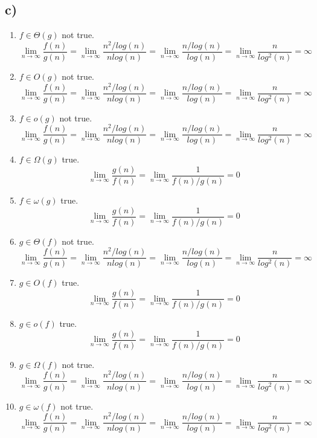 \documentclass{article}
\begin{document}
\subsection*{c)}
\begin{enumerate}
    \item $f \in \Theta(g)$ not true.
        $$ \lim_{n \to \infty} \frac{f(n)}{g(n)} = \lim_{n \to \infty} \frac{ n^2 / log(n)}{n log(n)} = \lim_{n \to \infty} \frac{ n / log(n) }{ log(n)} =
        \lim_{n \to \infty} \frac{n}{ log^2(n)} = \infty $$
    \item $f \in O(g)$ not true.
        $$ \lim_{n \to \infty} \frac{f(n)}{g(n)} = \lim_{n \to \infty} \frac{ n^2 / log(n)}{n log(n)} = \lim_{n \to \infty} \frac{ n / log(n) }{ log(n)} =
        \lim_{n \to \infty} \frac{n}{ log^2(n)} = \infty $$
    \item $f \in o(g)$ not true.
        $$ \lim_{n \to \infty} \frac{f(n)}{g(n)} = \lim_{n \to \infty} \frac{ n^2 / log(n)}{n log(n)} = \lim_{n \to \infty} \frac{ n / log(n) }{ log(n)} =
        \lim_{n \to \infty} \frac{n}{ log^2(n)} = \infty $$
    \item $f \in \Omega(g)$ true.
        $$ \lim_{n \to \infty} \frac{g(n)}{f(n)} = \lim_{n \to \infty} \frac{1}{f(n)/g(n)} = 0 $$
    \item $f \in \omega(g)$ true.
        $$ \lim_{n \to \infty} \frac{g(n)}{f(n)} = \lim_{n \to \infty} \frac{1}{f(n)/g(n)} = 0 $$
    \item $g \in \Theta(f)$ not true.
        $$ \lim_{n \to \infty} \frac{f(n)}{g(n)} = \lim_{n \to \infty} \frac{ n^2 / log(n)}{n log(n)} = \lim_{n \to \infty} \frac{ n / log(n) }{ log(n)} =
        \lim_{n \to \infty} \frac{n}{ log^2(n)} = \infty $$
    \item $g \in O(f)$ true.
        $$ \lim_{n \to \infty} \frac{g(n)}{f(n)} = \lim_{n \to \infty} \frac{1}{f(n)/g(n)} = 0 $$
    \item $g \in o(f)$ true.
        $$ \lim_{n \to \infty} \frac{g(n)}{f(n)} = \lim_{n \to \infty} \frac{1}{f(n)/g(n)} = 0 $$
    \item $g \in \Omega(f)$ not true.
        $$ \lim_{n \to \infty} \frac{f(n)}{g(n)} = \lim_{n \to \infty} \frac{ n^2 / log(n)}{n log(n)} = \lim_{n \to \infty} \frac{ n / log(n) }{ log(n)} =
        \lim_{n \to \infty} \frac{n}{ log^2(n)} = \infty $$
    \item $g \in \omega(f)$ not true.
        $$ \lim_{n \to \infty} \frac{f(n)}{g(n)} = \lim_{n \to \infty} \frac{ n^2 / log(n)}{n log(n)} = \lim_{n \to \infty} \frac{ n / log(n) }{ log(n)} =
        \lim_{n \to \infty} \frac{n}{ log^2(n)} = \infty $$
\end{enumerate}
\end{document}
